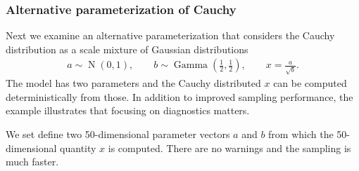 \documentclass[american,]{article}
\DeclareMathOperator{\N}{N}
\DeclareMathOperator{\Gam}{Gamma}
\begin{document}
\hypertarget{alternative-parameterization-of-cauchy}{%
\subsubsection{Alternative parameterization of
Cauchy}\label{alternative-parameterization-of-cauchy}}

Next we examine an alternative parameterization that considers the
Cauchy distribution as a scale mixture of Gaussian distributions
\begin{align}
  a \sim  \N(0,1), \qquad
  b \sim  \Gam\left(\frac{1}{2},\frac{1}{2}\right), \qquad
  x =  \frac{a}{\sqrt{b}}.
\end{align}
The model has two parameters and the Cauchy distributed \(x\) can be
computed deterministically from those. In addition to improved sampling 
performance, the example illustrates that focusing on diagnostics matters.

We set define two 50-dimensional parameter vectors $a$ and $b$ from which
the 50-dimensional quantity $x$ is computed. There are no warnings and
the sampling is much faster.







\end{document}
